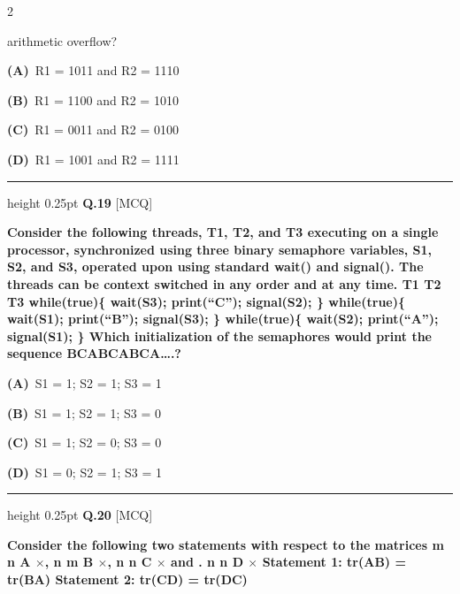 \documentclass[a4paper,10pt,twoside]{article}
\begin{document}
\begin{multicols}{2}
{arithmetic overflow? \par}
\par\vspace{2pt}\noindent
\textbf{(A)}~R1 = 1011 and R2 = 1110\par\vspace{2pt}\noindent
\textbf{(B)}~R1 = 1100 and R2 = 1010\par\vspace{2pt}\noindent
\textbf{(C)}~R1 = 0011 and R2 = 0100\par\vspace{2pt}\noindent
\textbf{(D)}~R1 = 1001 and R2 = 1111
\par\vspace{6pt}\hrule height 0.25pt\vspace{6pt}
\noindent\textbf{Q.19} \hfill {\footnotesize\textsf{[MCQ]}}
\par\vspace{2pt}
{\bfseries Consider the following threads, T1, T2, and T3 executing on a single processor,
synchronized using three binary semaphore variables, S1, S2, and S3, operated upon
using standard wait() and signal(). The threads can be context switched in
any order and at any time.
T1
T2
T3
while(true)\{
wait(S3);
print(``C'');
signal(S2); \}
while(true)\{
wait(S1);
print(``B'');
signal(S3); \}
while(true)\{
wait(S2);
print(``A'');
signal(S1); \}
Which initialization of the semaphores would print the sequence BCABCABCA….? \par}
\par\vspace{2pt}\noindent
\textbf{(A)}~S1 = 1; S2 = 1; S3 = 1\par\vspace{2pt}\noindent
\textbf{(B)}~S1 = 1; S2 = 1; S3 = 0\par\vspace{2pt}\noindent
\textbf{(C)}~S1 = 1; S2 = 0; S3 = 0\par\vspace{2pt}\noindent
\textbf{(D)}~S1 = 0; S2 = 1; S3 = 1
\par\vspace{6pt}\hrule height 0.25pt\vspace{6pt}
\noindent\textbf{Q.20} \hfill {\footnotesize\textsf{[MCQ]}}
\par\vspace{2pt}
{\bfseries Consider the following two statements with respect to the matrices
m n
A $\times$,
n m
B $\times$,
n n
C $\times$ and
.
n n
D $\times$
Statement 1: tr(AB) = tr(BA)
Statement 2: tr(CD) = tr(DC)
}
\end{multicols}
\end{document}
